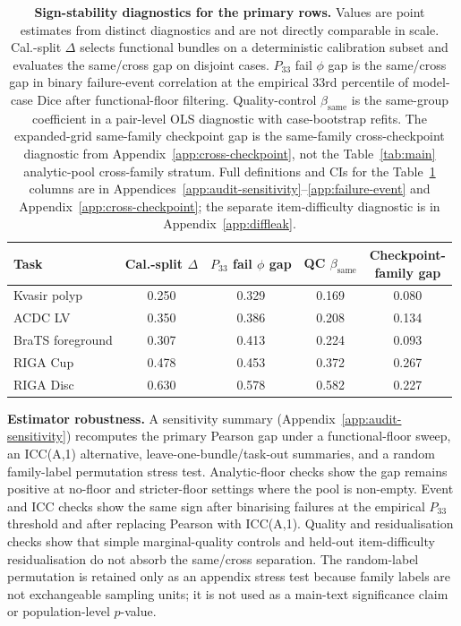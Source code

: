 \documentclass{article}
\begin{document}
\begin{table}[h]
  \caption{\textbf{Sign-stability diagnostics for the primary rows.} Values are point estimates from distinct diagnostics and are not directly comparable in scale. Cal.-split $\Delta$ selects functional bundles on a deterministic calibration subset and evaluates the same/cross gap on disjoint cases. $P_{33}$ fail $\phi$ gap is the same/cross gap in binary failure-event correlation at the empirical 33rd percentile of model-case Dice after functional-floor filtering. Quality-control $\beta_{\mathrm{same}}$ is the same-group coefficient in a pair-level OLS diagnostic with case-bootstrap refits. The expanded-grid same-family checkpoint gap is the same-family cross-checkpoint diagnostic from Appendix~\ref{app:cross-checkpoint}, not the Table~\ref{tab:main} analytic-pool cross-family stratum. Full definitions and CIs for the Table~\ref{tab:main-robustness} columns are in Appendices~\ref{app:audit-sensitivity}--\ref{app:failure-event} and Appendix~\ref{app:cross-checkpoint}; the separate item-difficulty diagnostic is in Appendix~\ref{app:diffleak}.}
  \label{tab:main-robustness}
  \centering\footnotesize
  \setlength{\tabcolsep}{4pt}
  \begin{tabular*}{\linewidth}{@{\extracolsep{\fill}}lcccc}
    \toprule
    Task & \makecell[c]{Cal.-split\\$\Delta$} & \makecell[c]{$P_{33}$ fail\\$\phi$ gap} & \makecell[c]{QC\\$\beta_{\mathrm{same}}$} & \makecell[c]{Checkpoint-\\family gap} \\
    \midrule
    Kvasir polyp & 0.250 & 0.329 & 0.169 & 0.080 \\
    ACDC LV & 0.350 & 0.386 & 0.208 & 0.134 \\
    BraTS foreground & 0.307 & 0.413 & 0.224 & 0.093 \\
    RIGA Cup & 0.478 & 0.453 & 0.372 & 0.267 \\
    RIGA Disc & 0.630 & 0.578 & 0.582 & 0.227 \\
    \bottomrule
  \end{tabular*}
\end{table}

\textbf{Estimator robustness.} A sensitivity summary (Appendix~\ref{app:audit-sensitivity}) recomputes the primary Pearson gap under a functional-floor sweep, an ICC(A,1) alternative, leave-one-bundle/task-out summaries, and a random family-label permutation stress test. Analytic-floor checks show the gap remains positive at no-floor and stricter-floor settings where the pool is non-empty. Event and ICC checks show the same sign after binarising failures at the empirical $P_{33}$ threshold and after replacing Pearson with ICC(A,1). Quality and residualisation checks show that simple marginal-quality controls and held-out item-difficulty residualisation do not absorb the same/cross separation. The random-label permutation is retained only as an appendix stress test because family labels are not exchangeable sampling units; it is not used as a main-text significance claim or population-level $p$-value.
\end{document}
